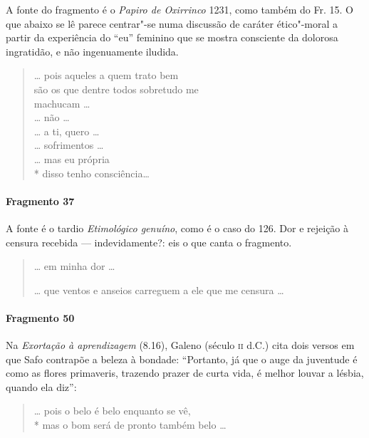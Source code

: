 {{\small A fonte do fragmento é o \textit{Papiro de Oxirrinco} 1231, como também do Fr.
15. O que abaixo se lê parece centrar"-se numa discussão de caráter ético"-moral
a partir da experiência do “eu” feminino que se mostra consciente da dolorosa
ingratidão, e não ingenuamente iludida.}

\begin{verse}
\ldots{} pois aqueles a quem trato bem\\
são os que dentre todos sobretudo me\\
machucam \ldots{}\\
\ldots{} não \ldots{}\\
\ldots{} a ti, quero \ldots{}\\
\ldots{} sofrimentos \ldots{}\\
\ldots{} mas eu própria\\*
disso tenho consciência\ldots{}
\end{verse}

\paragraph{Fragmento 37}

{\small A fonte é o tardio \textit{Etimológico genuíno}, como é o caso do 126. Dor e
rejeição à censura recebida --- indevidamente?: eis o que canta o fragmento.}

\begin{verse}
\ldots{} em minha dor \ldots{}

\ast\quad\ast\quad\ast

\ldots{} que ventos e anseios carreguem a ele que me \qb{}censura \ldots{}
\end{verse}

\paragraph{Fragmento 50}

{\small Na \textit{Exortação à aprendizagem} (8.16), Galeno (século \textsc{ii} d.C.) cita dois versos
em que Safo contrapõe a beleza à bondade: ``Portanto, já que o auge da
juventude é como as flores primaveris, trazendo prazer de curta vida, é melhor
louvar a lésbia, quando ela diz'':}

\begin{verse}
\ldots{} pois o belo é belo enquanto se vê,\\*
mas o bom será de pronto também belo \ldots{}
\end{verse}

}
